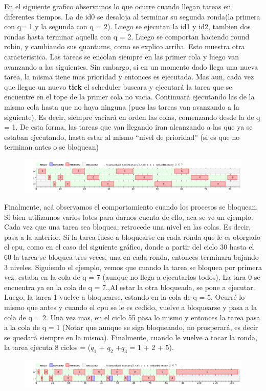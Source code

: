 \documentclass[10pt, a4paper]{article}
\begin{document}
En el siguiente grafico observamos lo que ocurre cuando llegan tareas en diferentes tiempos. La de id0 se desaloja al terminar su segunda ronda(la primera con q= 1 y la segunda con q = 2). Luego se ejecutan la id1 y id2, tambien dos rondas hasta terminar aquella con q = 2. Luego se comportan haciendo round robin, y cambiando sus quantums, como se explico arriba.
Esto muestra otra caracteristica. Las tareas se encolan siempre en las primer cola y luego van avanzando a las siguientes. Sin embargo, si en un momento dado llega una nueva tarea, la misma tiene mas prioridad y entonces es ejecutada. Mas aun, cada vez que llegue un nuevo \textbf{tick} el scheduler buscara y ejecutará la tarea que se encuentre en el tope de la primer cola no vacia. Continuará ejecutando las de la misma cola hasta que no haya ninguna (pues las tareas van avanzando a la siguiente). Es decir, siempre vaciará en orden las colas, comenzando desde la de q = 1.
De esta forma, las tareas que van llegando iran alcanzando a las que ya se estaban ejecutando, hasta estar al mismo ``nivel de prioridad'' (si es que no terminan antes o se bloquean)

\begin{figure}[H]
  	\centering
   	\includegraphics[width=1\textwidth]
   	 {imgs/mistery3.png}
	\caption{}
\end{figure}


Finalmente, acá observamos el comportamiento cuando los procesos se bloquean. Si bien utilizamos varios lotes para darnos cuenta de ello, aca se ve un ejemplo.
Cada vez que una tarea sea bloquea, retrocede una nivel en las colas. Es decir, pasa a la anterior. Si la tarea fuese a bloquearse en cada ronda que le es otorgado el cpu, como en el caso del siguiente gráfico, donde a partir del ciclo 30 hasta el 60  la tarea se bloquea tres veces, una en cada ronda, entonces terminara bajando 3 niveles. 
Siguiendo el ejemplo, vemos que cuando la tarea se bloquea por primera vez, estaba en la cola de q = 7 (aunque no llega a ejecutarlos todos). La tara 0 se encuentra ya en la cola de q = 7.,Al estar la otra bloqueada, se pone a ejecutar. Luego, la tarea 1 vuelve a bloquearse, estando en la cola de q = 5. Ocurré lo mismo que antes y cuando el cpu se le es cedido, vuelve a bloquearse y pasa a la cola de q = 2. Una vez mas, en el ciclo 55 pasa lo mismo y entonces la tarea pasa a la cola de q = 1 (Notar que aunque se siga bloqueando, no prosperará, es decir se quedará siempre en la misma). Finalmente, cuando le vuelve a tocar la ronda, la tarea ejecuta 8 ciclos = ($q_{1}$ + $q_{2}$ +$q_{3}$ = 1 + 2 + 5).   
\begin{figure}[H]
  	\centering
   	\includegraphics[width=1\textwidth]
   	 {imgs/mistery1.png}
	\caption{}
\end{figure}
\end{document}
